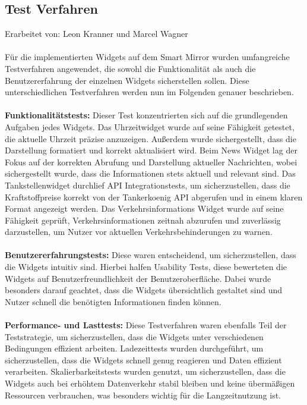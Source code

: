 \subsection{Test Verfahren}
Erarbeitet von: Leon Kranner und Marcel Wagner \\ \\
\noindent
Für die implementierten Widgets auf dem Smart Mirror wurden umfangreiche Testverfahren angewendet, die sowohl die Funktionalität als auch die Benutzererfahrung der einzelnen Widgets sicherstellen sollen. Diese unterschiedlichen Testverfahren werden nun im Folgenden genauer beschrieben. \\ \\
\noindent
\textbf{Funktionalitätstests:} Dieser Test konzentrierten sich auf die grundlegenden Aufgaben jedes Widgets. Das Uhrzeitwidget wurde auf seine Fähigkeit getestet, die aktuelle Uhrzeit präzise anzuzeigen. Außerdem wurde sichergestellt, dass die Darstellung formatiert und korrekt aktualisiert wird. Beim News Widget lag der Fokus auf der korrekten Abrufung und Darstellung aktueller Nachrichten, wobei sichergestellt wurde, dass die Informationen stets aktuell und relevant sind. Das Tankstellenwidget durchlief API Integrationstests, um sicherzustellen, dass die Kraftstoffpreise korrekt von der Tankerkoenig API abgerufen und in einem klaren Format angezeigt werden. Das Verkehrsinformations Widget wurde auf seine Fähigkeit geprüft, Verkehrsinformationen zeitnah abzurufen und zuverlässig darzustellen, um Nutzer vor aktuellen Verkehrsbehinderungen zu warnen. \\ \\
\noindent
\textbf{Benutzererfahrungstests:} Diese waren entscheidend, um sicherzustellen, dass die Widgets intuitiv sind. Hierbei halfen Usability Tests, diese bewerteten die Widgets auf Benutzerfreundlichkeit der Benutzeroberfläche. Dabei wurde besonders darauf geachtet, dass die Widgets übersichtlich gestaltet sind und Nutzer schnell die benötigten Informationen finden können. \\ \\
\noindent
\textbf{Performance- und Lasttests:} Diese Testverfahren waren ebenfalls Teil der Teststrategie, um sicherzustellen, dass die Widgets unter verschiedenen Bedingungen effizient arbeiten. Ladezeittests wurden durchgeführt, um sicherzustellen, dass die Widgets schnell genug reagieren und Daten effizient verarbeiten. Skalierbarkeitstests wurden genutzt, um sicherzustellen, dass die Widgets auch bei erhöhtem Datenverkehr stabil bleiben und keine übermäßigen Ressourcen verbrauchen, was besonders wichtig für die Langzeitnutzung ist. \\ \\
